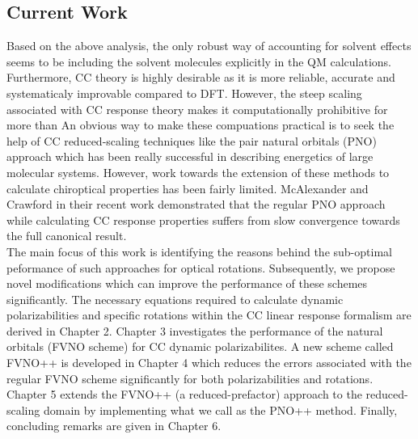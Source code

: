\subsection{Current Work}
Based on the above analysis, the only robust way of accounting for solvent effects seems to be including the solvent molecules explicitly 
in the QM calculations. Furthermore, CC theory is highly desirable as it is more reliable, accurate and systematicaly improvable compared to DFT.
However, the steep scaling associated with CC response theory makes it computationally prohibitive for more than 
An obvious way to make these compuations practical is to seek the help of CC reduced-scaling 
techniques like the pair natural orbitals (PNO) approach\cite{NeeseCCSD09,Neese09} which has been really successful in describing energetics of 
large molecular systems. However, work towards the extension of these methods to calculate chiroptical properties has been 
fairly limited\cite{Friedrich15,Gauss00,Korona04,McAlexander12,Russ04,Russ08}. McAlexander and Crawford in their recent 
work\cite{McAlexander15:LRCC} demonstrated that the regular PNO approach while calculating CC response properties 
suffers from slow convergence towards the full canonical result. \\
The main focus of this work is identifying the 
reasons behind the sub-optimal peformance of such approaches for optical rotations. Subsequently, we propose novel modifications
which can improve the performance of these schemes significantly. The necessary equations required to calculate dynamic polarizabilities 
and specific rotations within the CC linear response formalism are derived in Chapter 2. 
Chapter 3 investigates the performance of the natural orbitals (FVNO scheme) for CC dynamic polarizabilites.
A new scheme called FVNO++ is developed in Chapter 4 which reduces the errors associated with the regular FVNO scheme
significantly for both polarizabilities and rotations. Chapter 5 extends the FVNO++ (a reduced-prefactor) approach to the reduced-scaling 
domain by implementing what we call as the PNO++ method. Finally, concluding remarks are given in Chapter 6.
